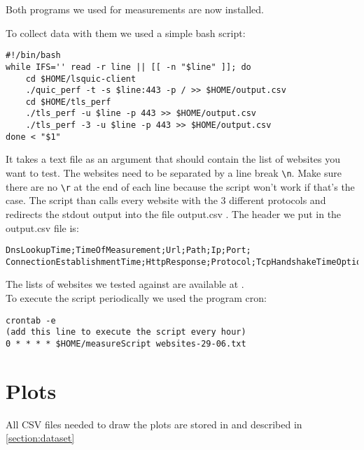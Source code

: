 Both programs we used for measurements are now installed.

To collect data with them we used a simple bash script:

\begin{lstlisting}
#!/bin/bash
while IFS='' read -r line || [[ -n "$line" ]]; do
	cd $HOME/lsquic-client
    ./quic_perf -t -s $line:443 -p / >> $HOME/output.csv
	cd $HOME/tls_perf
	./tls_perf -u $line -p 443 >> $HOME/output.csv
    ./tls_perf -3 -u $line -p 443 >> $HOME/output.csv
done < "$1"
\end{lstlisting}

It takes a text file as an argument that should contain the list of websites you want to test.
The websites need to be separated by a line break \verb|\n|.
Make sure there are no \verb|\r| at the end of each line because the script won't work if that's the case.
The script than calls every website with the 3 different protocols and redirects the stdout output into the file output.csv .
The header we put in the output.csv file is:
\begin{lstlisting}
DnsLookupTime;TimeOfMeasurement;Url;Path;Ip;Port;
ConnectionEstablishmentTime;HttpResponse;Protocol;TcpHandshakeTimeOptional
\end{lstlisting}

The lists of websites we tested against are available at \cite{Link:WebsiteLists}.\\

To execute the script periodically we used the program cron:
\begin{lstlisting}
crontab -e
(add this line to execute the script every hour)
0 * * * * $HOME/measureScript websites-29-06.txt
\end{lstlisting}

\section{Plots}

All CSV files needed to draw the plots are stored in \cite{Link:CSVData} and described in \ref{section:dataset}

